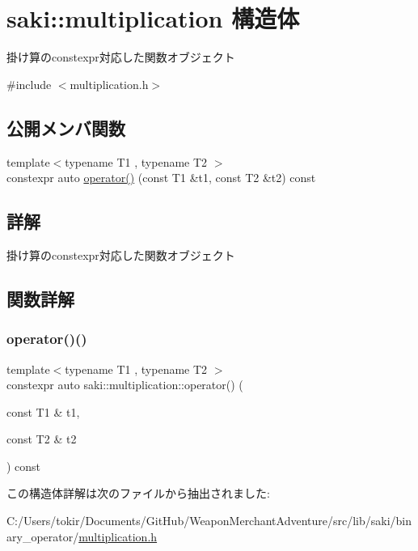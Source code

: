 \hypertarget{structsaki_1_1multiplication}{}\section{saki\+:\+:multiplication 構造体}
\label{structsaki_1_1multiplication}


掛け算のconstexpr対応した関数オブジェクト  




{\ttfamily \#include $<$multiplication.\+h$>$}

\subsection*{公開メンバ関数}
\begin{DoxyCompactItemize}
\item 
{\footnotesize template$<$typename T1 , typename T2 $>$ }\\constexpr auto \mbox{\hyperlink{structsaki_1_1multiplication_ad7c9cfc08911b6db3ea95d4cfd5ffa7f}{operator()}} (const T1 \&t1, const T2 \&t2) const
\end{DoxyCompactItemize}


\subsection{詳解}
掛け算のconstexpr対応した関数オブジェクト 

\subsection{関数詳解}
\mbox{\label{structsaki_1_1multiplication_ad7c9cfc08911b6db3ea95d4cfd5ffa7f}} 
\subsubsection{\texorpdfstring{operator()()}{operator()()}}
{\footnotesize\ttfamily template$<$typename T1 , typename T2 $>$ \\
constexpr auto saki\+::multiplication\+::operator() (\begin{DoxyParamCaption}\item[{const T1 \&}]{t1,  }\item[{const T2 \&}]{t2 }\end{DoxyParamCaption}) const\hspace{0.3cm}{\ttfamily [inline]}}



この構造体詳解は次のファイルから抽出されました\+:\begin{DoxyCompactItemize}
\item 
C\+:/\+Users/tokir/\+Documents/\+Git\+Hub/\+Weapon\+Merchant\+Adventure/src/lib/saki/binary\+\_\+operator/\mbox{\hyperlink{multiplication_8h}{multiplication.\+h}}\end{DoxyCompactItemize}
